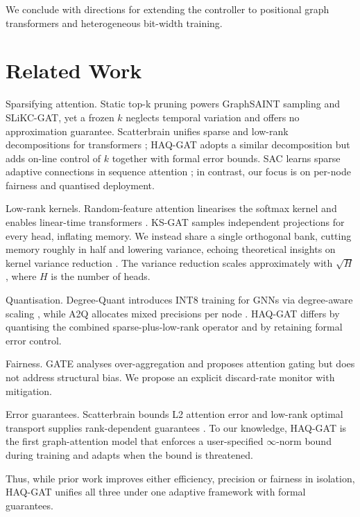 \documentclass{article} %
\begin{document}
We conclude with directions for extending the controller to positional graph transformers and heterogeneous bit-width training.

\section{Related Work}
\label{sec:related}
Sparsifying attention. Static top-k pruning powers GraphSAINT sampling \cite{zeng-2019-graphsaint} and SLiKC-GAT, yet a frozen \(k\) neglects temporal variation and offers no approximation guarantee. Scatterbrain unifies sparse and low-rank decompositions for transformers \cite{chen-2021-scatterbrain}; HAQ-GAT adopts a similar decomposition but adds on-line control of \(k\) together with formal error bounds. SAC learns sparse adaptive connections in sequence attention \cite{li-2020-sac}; in contrast, our focus is on per-node fairness and quantised deployment.

Low-rank kernels. Random-feature attention linearises the softmax kernel and enables linear-time transformers \cite{jaszczur-2021-sparse}. KS-GAT samples independent projections for every head, inflating memory. We instead share a single orthogonal bank, cutting memory roughly in half and lowering variance, echoing theoretical insights on kernel variance reduction \cite{chen-2020-convolutional}. The variance reduction scales approximately with \(\sqrt{H}\), where \(H\) is the number of heads.

Quantisation. Degree-Quant introduces INT8 training for GNNs via degree-aware scaling \cite{tailor-2020-degree}, while A2Q allocates mixed precisions per node \cite{zhu-2023-aggregation}. HAQ-GAT differs by quantising the combined sparse-plus-low-rank operator and by retaining formal error control.

Fairness. GATE analyses over-aggregation and proposes attention gating \cite{mustafa-2024-gate} but does not address structural bias. We propose an explicit discard-rate monitor with mitigation.

Error guarantees. Scatterbrain bounds L2 attention error \cite{chen-2021-scatterbrain} and low-rank optimal transport supplies rank-dependent guarantees \cite{scetbon-2022-low}. To our knowledge, HAQ-GAT is the first graph-attention model that enforces a user-specified \(\infty\)-norm bound during training and adapts when the bound is threatened.

Thus, while prior work improves either efficiency, precision or fairness in isolation, HAQ-GAT unifies all three under one adaptive framework with formal guarantees.
\end{document}
